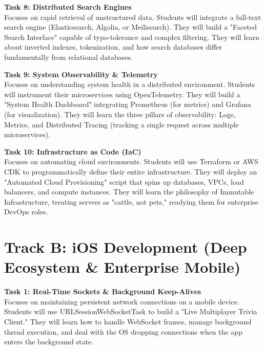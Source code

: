\vspace{0.3cm}

\noindent\textbf{Task 8: Distributed Search Engines} \\
Focuses on rapid retrieval of unstructured data. Students will integrate a full-text search engine (Elasticsearch, Algolia, or Meilisearch). They will build a "Faceted Search Interface" capable of typo-tolerance and complex filtering. They will learn about inverted indexes, tokenization, and how search databases differ fundamentally from relational databases.

\vspace{0.3cm}

\noindent\textbf{Task 9: System Observability \& Telemetry} \\
Focuses on understanding system health in a distributed environment. Students will instrument their microservices using OpenTelemetry. They will build a "System Health Dashboard" integrating Prometheus (for metrics) and Grafana (for visualization). They will learn the three pillars of observability: Logs, Metrics, and Distributed Tracing (tracking a single request across multiple microservices).

\vspace{0.3cm}

\noindent\textbf{Task 10: Infrastructure as Code (IaC)} \\
Focuses on automating cloud environments. Students will use Terraform or AWS CDK to programmatically define their entire infrastructure. They will deploy an "Automated Cloud Provisioning" script that spins up databases, VPCs, load balancers, and compute instances. They will learn the philosophy of Immutable Infrastructure, treating servers as "cattle, not pets," readying them for enterprise DevOps roles.

\newpage

\section*{Track B: iOS Development (Deep Ecosystem \& Enterprise Mobile)}

\noindent\textbf{Task 1: Real-Time Sockets \& Background Keep-Alives} \\
Focuses on maintaining persistent network connections on a mobile device. Students will use URLSessionWebSocketTask to build a "Live Multiplayer Trivia Client." They will learn how to handle WebSocket frames, manage background thread execution, and deal with the OS dropping connections when the app enters the background state.


